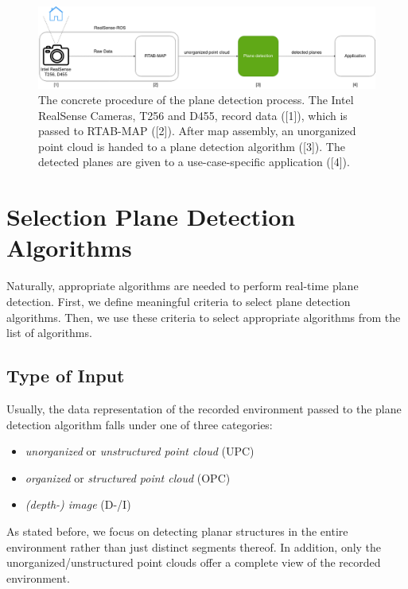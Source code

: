 \documentclass[main.tex]{subfiles}
\begin{document}
\begin{figure}[!ht]
    \centering
    \includegraphics[width=15 cm]{images/concept_specific.png}
    \caption[Concrete Concept Graphic]{The concrete procedure of the plane detection process. The Intel RealSense Cameras, T256 and D455, record data ([1]), which is passed to 
    RTAB-MAP ([2]). After map assembly, an unorganized point cloud is handed to a plane detection algorithm ([3]). 
    The detected planes are given to a use-case-specific application ([4]).}
    \label{fig:concept_spec}
\end{figure}

\section{Selection Plane Detection Algorithms}
Naturally, appropriate algorithms are needed to perform real-time plane detection.
First, we define meaningful criteria to select plane detection algorithms. Then, we use these criteria to select appropriate algorithms from the list of algorithms.

\subsection*{Type of Input}
Usually, the data representation of the recorded environment passed to the plane detection algorithm falls under one of three categories:
\begin{itemize}
    \item \textit{unorganized} or \textit{unstructured point cloud} (UPC)
    \item \textit{organized} or \textit{structured point cloud} (OPC)
    \item \textit{(depth-) image} (D-/I)
\end{itemize}

As stated before, we focus on detecting planar structures in the entire environment rather than just distinct segments thereof.
In addition, only the unorganized/unstructured point clouds offer a complete view of the recorded environment.
\end{document}
